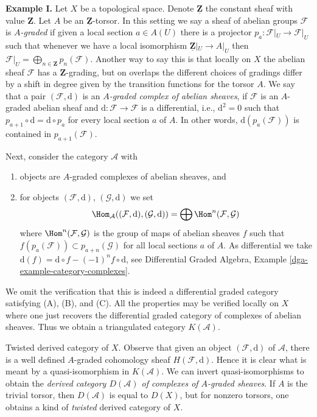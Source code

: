 \medskip\noindent
{\bf Example I.} Let $X$ be a topological space. Denote
$\underline{\mathbf{Z}}$ the constant sheaf with value $\mathbf{Z}$.
Let $A$ be an $\underline{\mathbf{Z}}$-torsor. In this setting we say
a sheaf of abelian groups $\mathcal{F}$ is {\it $A$-graded} if given a
local section $a \in A(U)$ there is a projector
$p_a : \mathcal{F}|_U \to \mathcal{F}|_U$ such that
whenever we have a local isomorphism $\underline{\mathbf{Z}}|_U \to A|_U$
then $\mathcal{F}|_U = \bigoplus_{n \in \mathbf{Z}} p_n(\mathcal{F})$.
Another way to say this is that locally on $X$ the abelian sheaf
$\mathcal{F}$ has a $\mathbf{Z}$-grading, but on overlaps the different
choices of gradings differ by a shift in degree given by the transition
functions for the torsor $A$.
We say that a pair $(\mathcal{F}, \text{d})$ is an
{\it $A$-graded complex of abelian sheaves}, if $\mathcal{F}$
is an $A$-graded abelian sheaf and $\text{d} : \mathcal{F} \to \mathcal{F}$
is a differential, i.e., $\text{d}^2 = 0$ such that
$p_{a + 1} \circ \text{d} = \text{d} \circ p_a$ for every local
section $a$ of $A$. In other words, $\text{d}(p_a(\mathcal{F}))$
is contained in $p_{a + 1}(\mathcal{F})$.

\medskip\noindent
Next, consider the category $\mathcal{A}$ with
\begin{enumerate}
\item objects are $A$-graded complexes of abelian sheaves, and
\item for objects $(\mathcal{F}, \text{d})$, $(\mathcal{G}, \text{d})$ we set
$$
\Hom_\mathcal{A}((\mathcal{F}, \text{d}), (\mathcal{G}, \text{d})) =
\bigoplus \Hom^n(\mathcal{F}, \mathcal{G})
$$
where $\Hom^n(\mathcal{F}, \mathcal{G})$ is the group of
maps of abelian sheaves $f$ such that
$f(p_a(\mathcal{F})) \subset p_{a + n}(\mathcal{G})$ for all
local sections $a$ of $A$. As differential we take
$\text{d}(f) = \text{d} \circ f - (-1)^n f \circ \text{d}$, see
Differential Graded Algebra, Example \ref{dga-example-category-complexes}.
\end{enumerate}
We omit the verification that this is indeed a differential graded category
satisfying (A), (B), and (C). All the properties may be verified locally on
$X$ where one just recovers the differential graded category of complexes
of abelian sheaves. Thus we obtain a triangulated category
$K(\mathcal{A})$.

\medskip\noindent
Twisted derived category of $X$. Observe that given an object
$(\mathcal{F}, \text{d})$ of $\mathcal{A}$, there is a well defined
$A$-graded cohomology sheaf $H(\mathcal{F}, \text{d})$.
Hence it is clear what is meant by a quasi-isomorphism
in $K(\mathcal{A})$. We can invert quasi-isomorphisms
to obtain the {\it derived category $D(\mathcal{A})$ of complexes of
$A$-graded sheaves}. If $A$ is the trivial torsor, then $D(\mathcal{A})$
is equal to $D(X)$, but for nonzero torsors, one obtains a kind of
{\it twisted} derived category of $X$.


